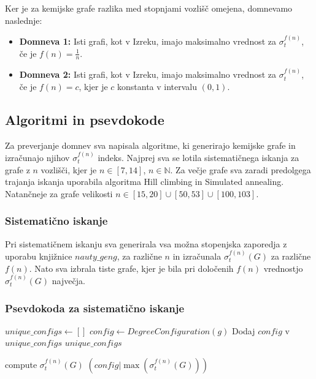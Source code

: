 \documentclass{article}
\begin{document}
Ker je za kemijske grafe razlika med stopnjami vozlišč omejena, domnevamo naslednje: 

\begin{itemize}
    \item \textbf{Domneva 1:} Isti grafi, kot v Izreku, imajo maksimalno vrednost za $\sigma_t^{f(n)}$, če je $f(n) = \frac{1}{n}$. 
    \item \textbf{Domneva 2:} Isti grafi, kot v Izreku, imajo maksimalno vrednost za $\sigma_t^{f(n)}$, če je $f(n) = c$, kjer je $c$ konstanta v intervalu $(0, 1)$. 

\end{itemize}

\subsection*{Algoritmi in psevdokode}
Za preverjanje domnev sva napisala algoritme, ki generirajo kemijske grafe in izračunajo njihov $\sigma_t^{f(n)}$ indeks.
Najprej sva se lotila sistematičnega iskanja za grafe z $n$ vozlišči, kjer je $n \in [7, 14]$, $n \in \mathbb{N}$.
Za večje grafe sva zaradi predolgega trajanja iskanja uporabila algoritma Hill climbing in Simulated annealing. Natančneje
za grafe velikosti $n \in [15, 20] \cup [50, 53] \cup [100, 103]$.

\subsubsection*{Sistematično iskanje}
Pri sistematičnem iskanju sva generirala vsa možna stopenjska zaporedja z uporabu knjižnice $nauty\_geng$, 
za različne $n$ in izračunala $\sigma_t^{f(n)}(G)$ za različne $f(n)$. Nato sva
izbrala tiste grafe, kjer je bila pri določenih $f(n)$ vrednostjo $\sigma_t^{f(n)}(G)$
največja.


\subsubsection*{Psevdokoda za sistematično iskanje}

\begin{algorithmic}[1]


    \State $unique\_configs \gets []$
        \State $config \gets DegreeConfiguration(g)$
            \State Dodaj $config$ v $unique\_configs$
        \EndIf
    \EndFor
    \State \Return $unique\_configs$
\EndFunction

        \State compute $\sigma_t^{f(n)}(G)$
    \EndFor
    \State \Return $(config | \max(\sigma_t^{f(n)}(G)))$
\EndFunction
\end{algorithmic}
\end{document}

